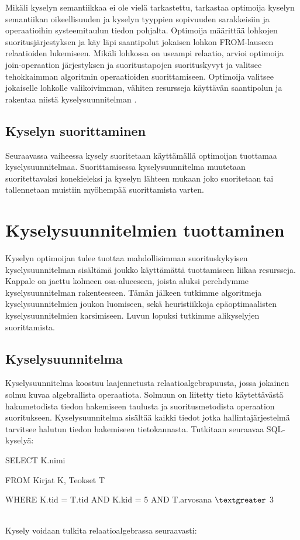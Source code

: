 \documentclass[finnish]{tktltiki2}
\theoremstyle{definition}
\theoremstyle{remark}
\begin{document}
Mikäli kyselyn semantiikkaa ei ole vielä tarkastettu, tarkastaa optimoija kyselyn semantiikan oikeellisuuden ja kyselyn tyyppien sopivuuden sarakkeisiin ja operaatioihin systeemitaulun tiedon pohjalta.  Optimoija määrittää lohkojen suoritusjärjestyksen ja käy läpi saantipolut jokaisen lohkon FROM-lauseen relaatioiden lukemiseen. Mikäli lohkossa on useampi relaatio, arvioi optimoija join-operaation järjestyksen ja suoritustapojen suorituskyvyt ja valitsee tehokkaimman algoritmin operaatioiden suorittamiseen. Optimoija valitsee jokaiselle lohkolle valikoivimman, vähiten resursseja käyttävän saantipolun ja rakentaa niistä kyselysuunnitelman \cite{selinger1979access}.

\subsection{Kyselyn suorittaminen}
Seuraavassa vaiheessa kysely suoritetaan käyttämällä optimoijan tuottamaa kyselysuunnitelmaa. Suorittamisessa kyselysuunnitelma muutetaan suoritettavaksi konekieleksi ja kyselyn lähteen mukaan joko suoritetaan tai tallennetaan muistiin myöhempää suorittamista varten. 

\section{Kyselysuunnitelmien tuottaminen} 
Kyselyn optimoijan tulee tuottaa mahdollisimman suorituskykyisen kyselysuunnitelman sisältämä joukko käyttämättä tuottamiseen liikaa resursseja. Kappale on jaettu kolmeen osa-alueeseen, joista aluksi perehdymme kyselysuunnitelman rakenteeseen. Tämän jälkeen tutkimme algoritmeja kyselysuunnitelmien joukon luomiseen, sekä heuristiikkoja epäoptimaalisten kyselysuunnitelmien karsimiseen. Luvun lopuksi tutkimme alikyselyjen suorittamista.

\subsection{Kyselysuunnitelma}
Kyselysuunnitelma koostuu laajennetusta relaatioalgebrapuusta, jossa jokainen solmu kuvaa algebrallista operaatiota. Solmuun on liitetty tieto käytettävästä hakumetodista tiedon hakemiseen taulusta ja suoritusmetodista operaation suoritukseen. Kyselysuunnitelma sisältää kaikki tiedot jotka hallintajärjestelmä tarvitsee halutun tiedon hakemiseen tietokannasta. Tutkitaan seuraavaa SQL-kyselyä:
\newline

\begin{frame}

SELECT K.nimi

FROM Kirjat K, Teokset T

WHERE K.tid = T.tid AND K.kid = 5 AND T.arvosana $\textgreater$  3
\end{frame}
\\\newline
Kysely voidaan tulkita relaatioalgebrassa seuraavasti:
\newline
\end{document}

